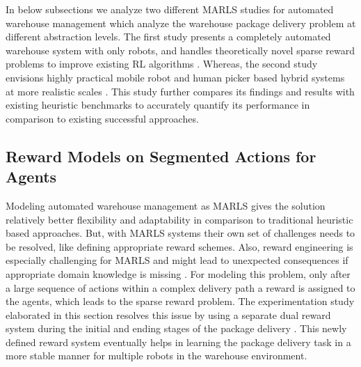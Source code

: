 \documentclass{article}
\begin{document}
In below subsections we analyze two different MARLS studies for automated warehouse management which analyze the warehouse package delivery problem at different abstraction levels.
The first study presents a completely automated warehouse system with only robots, and handles theoretically novel sparse reward problems to improve existing RL algorithms \cite{lee2022marl}.
Whereas, the second study envisions highly practical mobile robot and human picker based hybrid systems at more realistic scales \cite{krnjaic2022scalable}.
This study further compares its findings and results with existing heuristic benchmarks to accurately quantify its performance in comparison to existing successful approaches.


\subsection{Reward Models on Segmented Actions for Agents}


Modeling automated warehouse management as MARLS gives the solution relatively better flexibility and adaptability in comparison to traditional heuristic based approaches.
But, with MARLS systems their own set of challenges needs to be resolved, like defining appropriate reward schemes.
Also, reward engineering is especially challenging for MARLS and might lead to unexpected consequences if appropriate domain knowledge is missing \cite{cabi2019scaling}.
For modeling this problem, only after a large sequence of actions within a complex delivery path a reward is assigned to the agents, which leads to the sparse reward problem.
The experimentation study elaborated in this section resolves this issue by using a separate dual reward system during the initial and ending stages of the package delivery \cite{lee2022marl}.
This newly defined reward system eventually helps in learning the package delivery task in a more stable manner for multiple robots in the warehouse environment.
\end{document}

